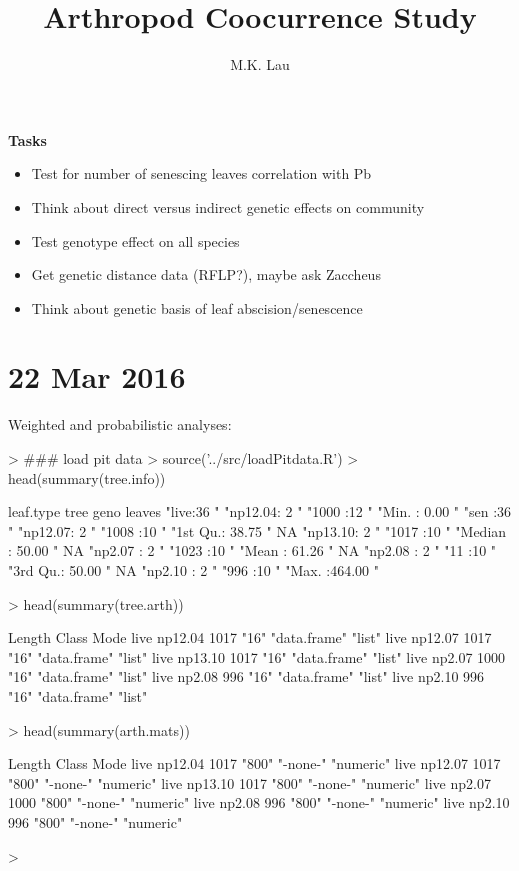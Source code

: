 \documentclass[12pt]{article}
\title{Arthropod Coocurrence Study}
\author{M.K. Lau}
\begin{document}
\maketitle

\textbf{Tasks}
\begin{itemize}
\item Test for number of senescing leaves correlation with Pb
\item Think about direct versus indirect genetic effects on community
\item Test genotype effect on all species
\item Get genetic distance data (RFLP?), maybe ask Zaccheus
\item Think about genetic basis of leaf abscision/senescence
\end{itemize}

\section{22 Mar 2016}

Weighted and probabilistic analyses:

\begin{Schunk}
\begin{Sinput}
> ### load pit data
> source('../src/loadPitdata.R')
> head(summary(tree.info))
\end{Sinput}
\begin{Soutput}
 leaf.type        tree           geno          leaves        
 "live:36  " "np12.04: 2  " "1000   :12  " "Min.   :  0.00  "
 "sen :36  " "np12.07: 2  " "1008   :10  " "1st Qu.: 38.75  "
 NA          "np13.10: 2  " "1017   :10  " "Median : 50.00  "
 NA          "np2.07 : 2  " "1023   :10  " "Mean   : 61.26  "
 NA          "np2.08 : 2  " "11     :10  " "3rd Qu.: 50.00  "
 NA          "np2.10 : 2  " "996    :10  " "Max.   :464.00  "
\end{Soutput}
\begin{Sinput}
> head(summary(tree.arth))
\end{Sinput}
\begin{Soutput}
                  Length Class        Mode  
live np12.04 1017 "16"   "data.frame" "list"
live np12.07 1017 "16"   "data.frame" "list"
live np13.10 1017 "16"   "data.frame" "list"
live np2.07 1000  "16"   "data.frame" "list"
live np2.08 996   "16"   "data.frame" "list"
live np2.10 996   "16"   "data.frame" "list"
\end{Soutput}
\begin{Sinput}
> head(summary(arth.mats))
\end{Sinput}
\begin{Soutput}
                  Length Class    Mode     
live np12.04 1017 "800"  "-none-" "numeric"
live np12.07 1017 "800"  "-none-" "numeric"
live np13.10 1017 "800"  "-none-" "numeric"
live np2.07 1000  "800"  "-none-" "numeric"
live np2.08 996   "800"  "-none-" "numeric"
live np2.10 996   "800"  "-none-" "numeric"
\end{Soutput}
\begin{Sinput}
> 
\end{Sinput}
\end{Schunk}
\end{document}
